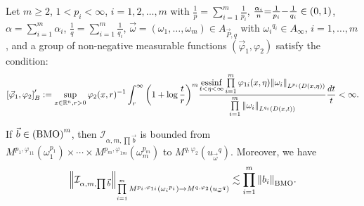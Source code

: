 \documentclass[11pt, twoside, leqno]{article}
\begin{document}
\begin{thm}\label{CFRI1}
	Let $m\geq 2$, $1< p_i<\infty$, $i=1,2,\ldots,m$ with $\frac{1}{p} = \sum\limits_{i = 1}^m {\frac{1}{{{p_i}}}}$, $\frac{{{\alpha _i}}}{n}{\rm{ = }}\frac{1}{{{p_i}}}{\rm{ - }}\frac{1}{{{q_i}}} \in (0,1)$, $\alpha  = \sum\limits_{i = 1}^m {{\alpha _i}}$, $\frac{1}{q} = \sum\limits_{i = 1}^m {\frac{1}{{{q_i}}}}$, $\vec{\omega}=(\omega_1,\ldots,\omega_m) \in {A_{\vec P,q}}$ with ${\omega _i}^{{q_i}} \in {A_\infty }$, $i = 1, \ldots ,m$, and a group of non-negative measurable functions $({{\vec \varphi }_1},{\varphi _2})$ satisfy the condition:
	\begin{equation}\label{con4}
	\left[ {{{\vec \varphi }_1},{\varphi _2}} \right]_B^\prime : = \mathop {\sup }\limits_{x \in {{\mathbb R^n}},r > 0} {\varphi _2}{(x,r)^{{\rm{ - }}1}}\int_r^\infty  {{{\left( {1 + \log \frac{t}{r}} \right)}^m}\frac{{\mathop {{\rm{essinf}}}\limits_{t < \eta  < \infty } \prod\limits_{i = 1}^m {{\varphi _{1i}}(x,\eta ){{\left\| {{\omega _i}} \right\|}_{{L^{{p_i}}}(D(x,\eta ))}}} }}{{\prod\limits_{i = 1}^m {{{\left\| {{\omega _i}} \right\|}_{{L^{{q_i}}}(D(x,t))}}} }}\frac{{dt}}{t}}  < \infty.
	\end{equation}
	
	If $\vec b \in {\left( {\rm BMO} \right)^m}$, then ${{\mathcal I}_{\alpha, m,\prod \vec b }}$ is bounded from ${M^{{p_1},{\varphi _{11}}}}(\omega _1^{{p_1}}) \times  \cdots  \times {M^{{p_m},{\varphi _{1m}}}}(\omega _m^{{p_m}})$ to ${M^{q,{\varphi _2}}}({u_{\vec \omega }}^q)$.
	Moreover, we have 
	$${\left\| {\mathcal{I}_{\alpha,m,\prod \vec b }} \right\|_{\prod\limits_{i = 1}^m {{M^{{p_i},{\varphi _{1i}}}}\left( {{\omega _i}^{{p_i}}} \right)}  \to {M^{q,{\varphi _2}}}\left( {{u_{\vec \omega }}^q} \right)}} \lesssim \prod\limits_{i = 1}^m {{{\left\| {{b_i}} \right\|}_{\rm BMO}}}.$$
\end{thm}
\end{document}
